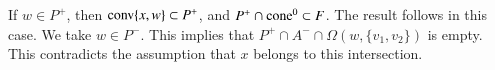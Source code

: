 \begin{tarskidata}
\begin{tarski}
\begin{proved}
If $w\in P^+$, then ${\operatorname{conv}}\{x,w\}\subset P^+$, and
$P^+\cap {\operatorname{cone}}^0 \subset F$.  The result follows in this case.
We take $w\in P^-$.  This implies that $P^+\cap A^-\cap \Omega(w,\{v_1,v_2\})$
is empty.  This contradicts the assumption that $x$ belongs to this
intersection.
%
%
%
%
%
%
% 
\swallowed\end{proved}
\end{tarski}

 



\begin{tarski}


\end{tarski}
\end{tarskidata}
